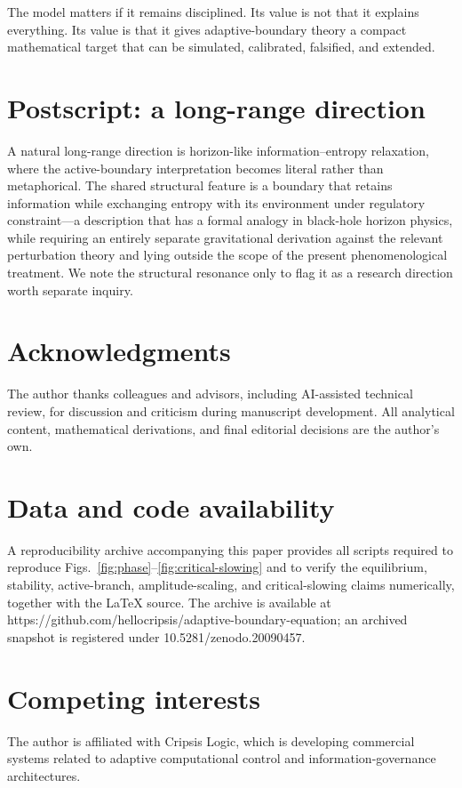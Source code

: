 \documentclass[11pt]{article}
\begin{document}
The model matters if it remains disciplined. Its value is not that it explains everything. Its value is that it gives adaptive-boundary theory a compact mathematical target that can be simulated, calibrated, falsified, and extended.

\section*{Postscript: a long-range direction}
A natural long-range direction is horizon-like information--entropy relaxation, where the active-boundary interpretation becomes literal rather than metaphorical. The shared structural feature is a boundary that retains information while exchanging entropy with its environment under regulatory constraint---a description that has a formal analogy in black-hole horizon physics, while requiring an entirely separate gravitational derivation against the relevant perturbation theory and lying outside the scope of the present phenomenological treatment. We note the structural resonance only to flag it as a research direction worth separate inquiry.

\section*{Acknowledgments}
The author thanks colleagues and advisors, including AI-assisted technical review, for discussion and criticism during manuscript development. All analytical content, mathematical derivations, and final editorial decisions are the author's own.

\section*{Data and code availability}
A reproducibility archive accompanying this paper provides all scripts required to reproduce Figs.~\ref{fig:phase}--\ref{fig:critical-slowing} and to verify the equilibrium, stability, active-branch, amplitude-scaling, and critical-slowing claims numerically, together with the LaTeX source. The archive is available at https://github.com/hellocripsis/adaptive-boundary-equation; an archived snapshot is registered under 10.5281/zenodo.20090457.

\section*{Competing interests}
The author is affiliated with Cripsis Logic, which is developing commercial systems related to adaptive computational control and information-governance architectures.
\end{document}
